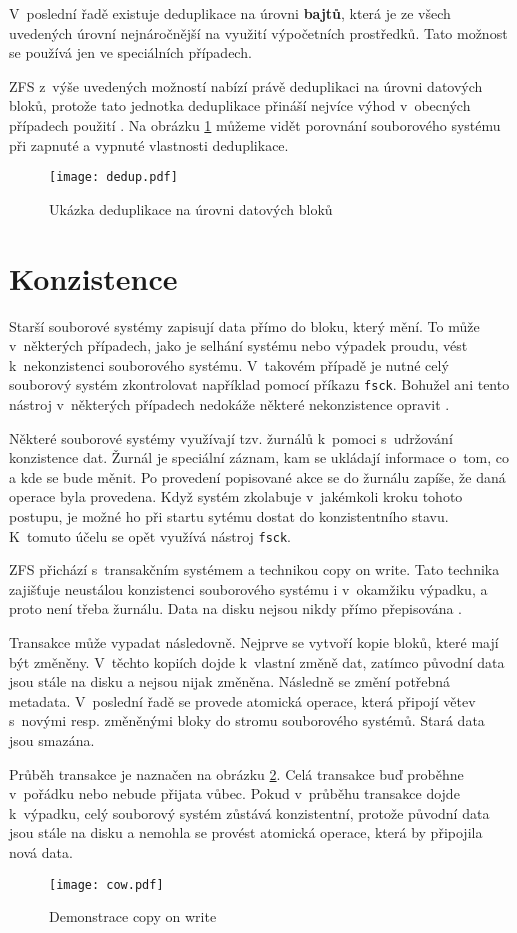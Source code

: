 V~poslední řadě existuje deduplikace na úrovni \textbf{bajtů}, která je ze všech uvedených úrovní nejnáročnější na využití výpočetních prostředků. Tato možnost se používá jen ve speciálních případech.

ZFS z~výše uvedených možností nabízí právě deduplikaci na úrovni datových bloků, protože tato jednotka deduplikace přináší nejvíce výhod v~obecných případech použití \cite{dedup}. Na obrázku \ref{blockdedup} můžeme vidět porovnání souborového systému při zapnuté a vypnuté vlastnosti deduplikace.
\begin{figure}
    \texttt{[image: dedup.pdf]}
    \caption{Ukázka deduplikace na úrovni datových bloků}
    \label{blockdedup}
\end{figure}
\section{Konzistence}
\label{consitence}
Starší souborové systémy zapisují data přímo do bloku, který mění. To může v~některých případech, jako je selhání systému nebo výpadek proudu, vést k~nekonzistenci souborového systému. V~takovém případě je nutné celý souborový systém zkontrolovat například pomocí příkazu \verb|fsck|. Bohužel ani tento nástroj v~některých případech nedokáže některé nekonzistence opravit \cite{transaction}.

Některé souborové systémy využívají tzv. žurnálů k~pomoci s~udržování konzistence dat. Žurnál je speciální záznam, kam se ukládají informace o~tom, co a kde se bude měnit. Po provedení popisované akce se do žurnálu zapíše, že daná operace byla provedena. Když systém zkolabuje v~jakémkoli kroku tohoto postupu, je možné ho při startu sytému dostat do konzistentního stavu. K~tomuto účelu se opět využívá nástroj \verb|fsck|.

ZFS přichází s~transakčním systémem a technikou copy on write. Tato technika zajišťuje neustálou konzistenci souborového systému i v~okamžiku výpadku, a proto není třeba žurnálu. Data na disku nejsou nikdy přímo přepisována \cite{transaction}.

Transakce může vypadat následovně. Nejprve se vytvoří kopie bloků, které mají být změněny. V~těchto kopiích dojde k~vlastní změně dat, zatímco původní data jsou stále na disku a nejsou nijak změněna. Následně se změní potřebná metadata. V~poslední řadě se provede atomická operace, která připojí větev s~novými resp. změněnými bloky do stromu souborového systémů. Stará data jsou smazána.

Průběh transakce je naznačen na obrázku \ref{cow}. Celá transakce buď proběhne v~pořádku nebo nebude přijata vůbec. Pokud v~průběhu transakce dojde k~výpadku, celý souborový systém zůstává konzistentní, protože původní data jsou stále na disku a nemohla se provést atomická operace, která by připojila nová data.
\begin{figure}
    \centering
    \texttt{[image: cow.pdf]}
    \caption{Demonstrace copy on write}
    \label{cow}
\end{figure}
